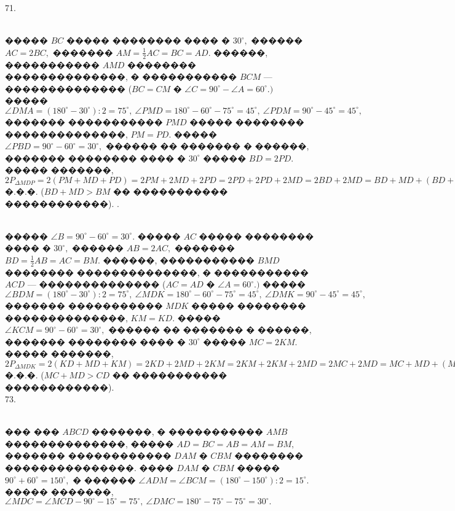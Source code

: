 \documentclass[12pt]{article}
\begin{document}
71. \begin{figure}[ht!]
\end{figure}\\
����� $BC$ ����� �������� ���� � $30^\circ,$ ������ $AC=2BC,$ ������� $AM=\frac{1}{2}AC=BC=AD.$ ������, ����������� $AMD$ �������� ��������������, � ����������� $BCM$ --- �������������� ($BC=CM$ � $\angle C=90^\circ-\angle A=60^\circ.)$ ����� $\angle DMA=(180^\circ-30^\circ):2=75^\circ,\ \angle PMD=180^\circ-60^\circ-75^\circ=45^\circ,\ \angle PDM=90^\circ-45^\circ=45^\circ,$ ������� ����������� $PMD$ ����� �������� ��������������, $PM=PD.$ ����� $\angle PBD=90^\circ-60^\circ=30^\circ,$ ������ �� ������� � ������, ������� �������� ���� � $30^\circ$ ����� $BD=2PD.$ ����� �������, $2P_{\Delta MDP}=2(PM+MD+PD)=
2PM+2MD+2PD=2PD+2PD+2MD=2BD+2MD=BD+MD+(BD+MD)>BD+MD+BM=P_{\Delta MDB},$ �.�.�. ($BD+MD>BM$ �� ����������� ������������).\newpage
{}. \begin{figure}[ht!]
\end{figure}\\
����� $\angle B=90^\circ-60^\circ=30^\circ.$ ����� $AC$ ����� �������� ���� � $30^\circ,$ ������ $AB=2AC,$ ������� $BD=\frac{1}{2}AB=AC=BM.$ ������, ����������� $BMD$ �������� ��������������, � ����������� $ACD$ --- �������������� ($AC=AD$ � $\angle A=60^\circ.)$ ����� $\angle BDM=(180^\circ-30^\circ):2=75^\circ,\ \angle MDK=180^\circ-60^\circ-75^\circ=45^\circ,\ \angle DMK=90^\circ-45^\circ=45^\circ,$ ������� ����������� $MDK$ ����� �������� ��������������, $KM=KD.$ ����� $\angle KCM=90^\circ-60^\circ=30^\circ,$ ������ �� ������� � ������, ������� �������� ���� � $30^\circ$ ����� $MC=2KM.$ ����� �������, $2P_{\Delta MDK}=2(KD+MD+KM)=
2KD+2MD+2KM=2KM+2KM+2MD=2MC+2MD=MC+MD+(MC+MD)>MC+MD+CD=P_{\Delta DMC},$ �.�.�. ($MC+MD>CD$ �� ����������� ������������).\\
73. \begin{figure}[ht!]
\end{figure}\\
��� ��� $ABCD$ �������, � ����������� $AMB$ ��������������, ����� $AD=BC=AB=AM=BM,$ ������� ������������ $DAM$ � $CBM$ �������� ���������������. ���� $DAM$ � $CBM$ ����� $90^\circ+60^\circ=150^\circ,$ � ������ $\angle ADM=\angle BCM=(180^\circ-150^\circ):2=15^\circ.$ ����� �������, $\angle MDC=\angle MCD-90^\circ-15^\circ=75^\circ,\ \angle DMC=180^\circ-75^\circ-75^\circ=30^\circ.$\\
\end{document}
